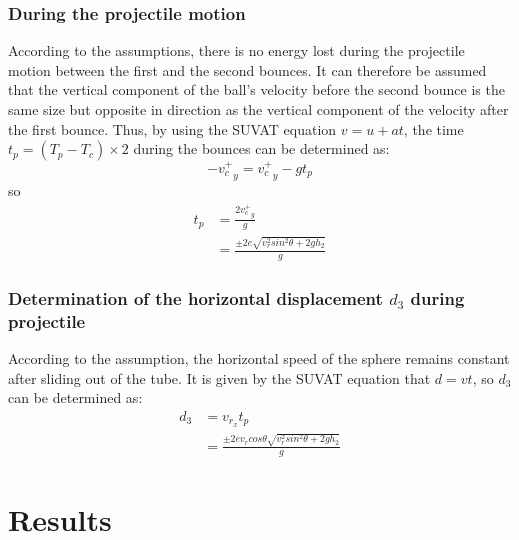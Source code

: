 \documentclass[conference]{IEEEtran}
\begin{document}
        \subsubsection{During the projectile motion}
        According to the assumptions, there is no energy lost during the projectile motion between the first and the second bounces. It can therefore be assumed that the vertical component of the ball's velocity before the second bounce is the same size but opposite in direction as the vertical component of the velocity after the first bounce. Thus, by using the SUVAT equation $v = u + at$, the time $t_p = (T_p - T_c)\times2 $ during the bounces can be determined as:
        $$-{v^+_c}_y = {v^+_c}_y - gt_p$$
        so 
        \begin{equation}
            \begin{aligned}
                t_p &= \frac{2{v^+_c}_y}{g}\\
                    &= \frac{\pm2e\sqrt{{v^2_{r}sin^2\theta}+2gh_2}}{g}
            \end{aligned}
        \end{equation}
        \subsubsection{Determination of the horizontal displacement $d_3$ during projectile}
        According to the assumption, the horizontal speed of the sphere remains constant after sliding out of the tube. It is given by the SUVAT equation that $d = vt$, so $d_3$ can be determined as:
        \begin{equation}
            \begin{aligned}
                d_3 &= v_{r_x}t_p\\
                &=  \frac{\pm2ev_rcos\theta\sqrt{{v^2_{r}sin^2\theta}+2gh_2}}{g}
            \end{aligned}
        \end{equation}
    \section{Results}
\end{document}

